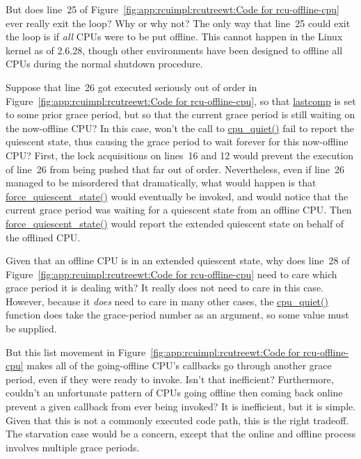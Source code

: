\QuickQ{}
	But does line~25 of
	Figure~\ref{fig:app:rcuimpl:rcutreewt:Code for rcu-offline-cpu}
	ever really exit the loop?
	Why or why not?
\QuickA{}
	The only way that line~25 could exit the loop is if \emph{all}
	CPUs were to be put offline.
	This cannot happen in the Linux kernel as of 2.6.28, though
	other environments have been designed to offline all CPUs
	during the normal shutdown procedure.

\QuickQ{}
	Suppose that line~26 got executed seriously out of order in
	Figure~\ref{fig:app:rcuimpl:rcutreewt:Code for rcu-offline-cpu},
	so that \url{lastcomp} is set to some prior grace period, but
	so that the current grace period is still waiting on the
	now-offline CPU?
	In this case, won't the call to \url{cpu_quiet()} fail to
	report the quiescent state, thus causing the grace period
	to wait forever for this now-offline CPU?
\QuickA{}
	First, the lock acquisitions on lines~16 and 12 would prevent
	the execution of line~26 from being pushed that far out of
	order.
	Nevertheless, even if line~26 managed to be misordered that
	dramatically, what would happen is that \url{force_quiescent_state()}
	would eventually be invoked, and would notice that the current
	grace period was waiting for a quiescent state from an offline
	CPU.
	Then \url{force_quiescent_state()} would report the extended
	quiescent state on behalf of the offlined CPU.

\QuickQ{}
	Given that an offline CPU is in an extended quiescent state,
	why does line~28 of
	Figure~\ref{fig:app:rcuimpl:rcutreewt:Code for rcu-offline-cpu}
	need to care which grace period it is
	dealing with?
\QuickA{}
	It really does not need to care in this case.
	However, because it \emph{does} need to care in many other
	cases, the \url{cpu_quiet()} function does take the
	grace-period number as an argument, so some value must be
	supplied.

\QuickQ{}
	But this list movement in
	Figure~\ref{fig:app:rcuimpl:rcutreewt:Code for rcu-offline-cpu}
	makes all of the going-offline CPU's callbacks go through
	another grace period, even if they were ready to invoke.
	Isn't that inefficient?
	Furthermore, couldn't an unfortunate pattern of CPUs going
	offline then coming back online prevent a given callback from
	ever being invoked?
\QuickA{}
	It is inefficient, but it is simple.
	Given that this is not a commonly executed code path, this
	is the right tradeoff.
	The starvation case would be a concern, except that the
	online and offline process involves multiple grace periods.

